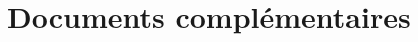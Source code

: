 \documentclass[a4paper,12pt]{article}
\begin{document}


\renewcommand{\contentsname}{Table des matières}
\tableofcontents

\newpage



\newpage

\newpage

\newpage

\newpage
\appendix
\section{Documents complémentaires}


\end{document}
